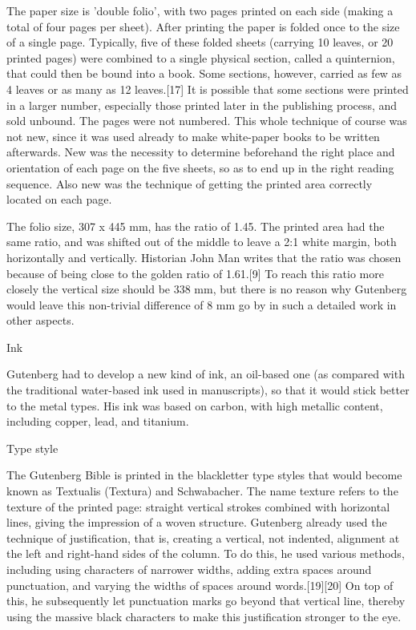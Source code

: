 {{The paper size is 'double folio', with two pages printed on each side (making a total of four pages per sheet). After printing the paper is folded once to the size of a single page. Typically, five of these folded sheets (carrying 10 leaves, or 20 printed pages) were combined to a single physical section, called a quinternion, that could then be bound into a book. Some sections, however, carried as few as 4 leaves or as many as 12 leaves.[17] It is possible that some sections were printed in a larger number, especially those printed later in the publishing process, and sold unbound. The pages were not numbered. This whole technique of course was not new, since it was used already to make white-paper books to be written afterwards. New was the necessity to determine beforehand the right place and orientation of each page on the five sheets, so as to end up in the right reading sequence. Also new was the technique of getting the printed area correctly located on each page.

The folio size, 307 x 445 mm, has the ratio of 1.45. The printed area had the same ratio, and was shifted out of the middle to leave a 2:1 white margin, both horizontally and vertically. Historian John Man writes that the ratio was chosen because of being close to the golden ratio of 1.61.[9] To reach this ratio more closely the vertical size should be 338 mm, but there is no reason why Gutenberg would leave this non-trivial difference of 8 mm go by in such a detailed work in other aspects.

Ink

Gutenberg had to develop a new kind of ink, an oil-based one (as compared with the traditional water-based ink used in manuscripts), so that it would stick better to the metal types. His ink was based on carbon, with high metallic content, including copper, lead, and titanium.

Type style

The Gutenberg Bible is printed in the blackletter type styles that would become known as Textualis (Textura) and Schwabacher. The name texture refers to the texture of the printed page: straight vertical strokes combined with horizontal lines, giving the impression of a woven structure. Gutenberg already used the technique of justification, that is, creating a vertical, not indented, alignment at the left and right-hand sides of the column. To do this, he used various methods, including using characters of narrower widths, adding extra spaces around punctuation, and varying the widths of spaces around words.[19][20] On top of this, he subsequently let punctuation marks go beyond that vertical line, thereby using the massive black characters to make this justification stronger to the eye.


}}
